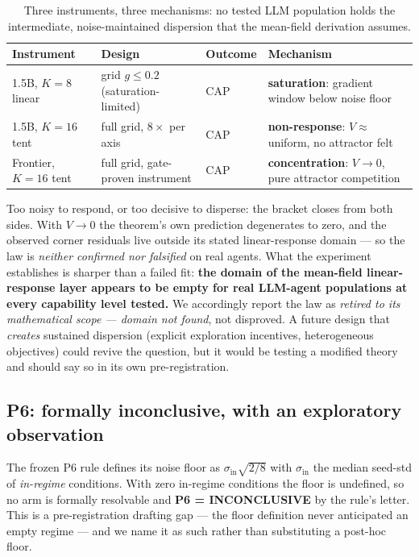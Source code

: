\documentclass{article} %
\begin{document}
\begin{table}[t]
\centering
\small
\caption{Three instruments, three mechanisms: no tested LLM population holds the intermediate, noise-maintained dispersion that the mean-field derivation assumes.}
\label{tab:bracket}
\footnotesize
\begin{tabular}{@{}llll@{}}
\toprule
Instrument & Design & Outcome & Mechanism \\
\midrule
1.5B, $K=8$ linear & grid $g \leq 0.2$ (saturation-limited) & CAP & \textbf{saturation}: gradient window below noise floor \\
1.5B, $K=16$ tent & full grid, $8\times$ per axis & CAP & \textbf{non-response}: $V \approx$ uniform, no attractor felt \\
Frontier, $K=16$ tent & full grid, gate-proven instrument & CAP & \textbf{concentration}: $V \to 0$, pure attractor competition \\
\bottomrule
\end{tabular}
\end{table}

Too noisy to respond, or too decisive to disperse: the bracket closes from both sides. With $V \to 0$ the theorem's own prediction degenerates to zero, and the observed corner residuals live outside its stated linear-response domain --- so the law is \emph{neither confirmed nor falsified} on real agents. What the experiment establishes is sharper than a failed fit: \textbf{the domain of the mean-field linear-response layer appears to be empty for real LLM-agent populations at every capability level tested.} We accordingly report the law as \emph{retired to its mathematical scope --- domain not found}, not disproved. A future design that \emph{creates} sustained dispersion (explicit exploration incentives, heterogeneous objectives) could revive the question, but it would be testing a modified theory and should say so in its own pre-registration.

\subsection{P6: formally inconclusive, with an exploratory observation}
\label{sec:p6}

The frozen P6 rule defines its noise floor as $\sigma_{\mathrm{in}}\sqrt{2/8}$ with $\sigma_{\mathrm{in}}$ the median seed-std of \emph{in-regime} conditions. With zero in-regime conditions the floor is undefined, so no arm is formally resolvable and \textbf{P6 = INCONCLUSIVE} by the rule's letter. This is a pre-registration drafting gap --- the floor definition never anticipated an empty regime --- and we name it as such rather than substituting a post-hoc floor.
\end{document}
